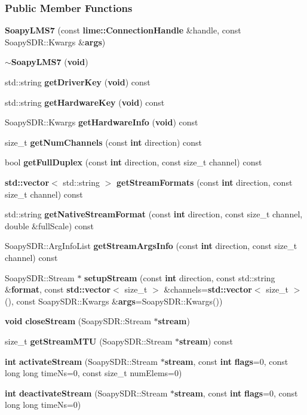 \subsubsection*{Public Member Functions}
\begin{DoxyCompactItemize}
\item 
{\bf Soapy\+L\+M\+S7} (const {\bf lime\+::\+Connection\+Handle} \&handle, const Soapy\+S\+D\+R\+::\+Kwargs \&{\bf args})
\item 
{\bf $\sim$\+Soapy\+L\+M\+S7} ({\bf void})
\item 
std\+::string {\bf get\+Driver\+Key} ({\bf void}) const 
\item 
std\+::string {\bf get\+Hardware\+Key} ({\bf void}) const 
\item 
Soapy\+S\+D\+R\+::\+Kwargs {\bf get\+Hardware\+Info} ({\bf void}) const 
\item 
size\+\_\+t {\bf get\+Num\+Channels} (const {\bf int} direction) const 
\item 
bool {\bf get\+Full\+Duplex} (const {\bf int} direction, const size\+\_\+t channel) const 
\item 
{\bf std\+::vector}$<$ std\+::string $>$ {\bf get\+Stream\+Formats} (const {\bf int} direction, const size\+\_\+t channel) const 
\item 
std\+::string {\bf get\+Native\+Stream\+Format} (const {\bf int} direction, const size\+\_\+t channel, double \&full\+Scale) const 
\item 
Soapy\+S\+D\+R\+::\+Arg\+Info\+List {\bf get\+Stream\+Args\+Info} (const {\bf int} direction, const size\+\_\+t channel) const 
\item 
Soapy\+S\+D\+R\+::\+Stream $\ast$ {\bf setup\+Stream} (const {\bf int} direction, const std\+::string \&{\bf format}, const {\bf std\+::vector}$<$ size\+\_\+t $>$ \&channels={\bf std\+::vector}$<$ size\+\_\+t $>$(), const Soapy\+S\+D\+R\+::\+Kwargs \&{\bf args}=Soapy\+S\+D\+R\+::\+Kwargs())
\item 
{\bf void} {\bf close\+Stream} (Soapy\+S\+D\+R\+::\+Stream $\ast${\bf stream})
\item 
size\+\_\+t {\bf get\+Stream\+M\+TU} (Soapy\+S\+D\+R\+::\+Stream $\ast${\bf stream}) const 
\item 
{\bf int} {\bf activate\+Stream} (Soapy\+S\+D\+R\+::\+Stream $\ast${\bf stream}, const {\bf int} {\bf flags}=0, const long long time\+Ns=0, const size\+\_\+t num\+Elems=0)
\item 
{\bf int} {\bf deactivate\+Stream} (Soapy\+S\+D\+R\+::\+Stream $\ast${\bf stream}, const {\bf int} {\bf flags}=0, const long long time\+Ns=0)

\end{DoxyCompactItemize}
